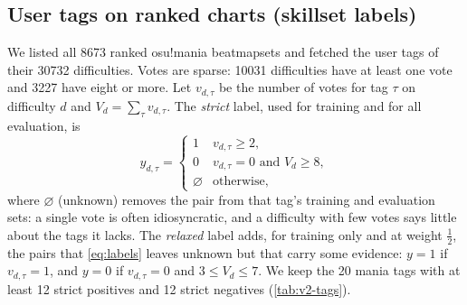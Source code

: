 \documentclass[10pt,twocolumn]{article}
\begin{document}
\subsection{User tags on ranked charts (skillset labels)}\label{sec:tags-data}
We listed all \num{8673} ranked osu!mania beatmapsets and fetched the user tags of their \num{30732} difficulties. Votes are sparse: \num{10031} difficulties have at least one vote and \num{3227} have eight or more. Let $v_{d,\tau}$ be the number of votes for tag $\tau$ on difficulty $d$ and $V_d=\sum_\tau v_{d,\tau}$. The \emph{strict} label, used for training and for all evaluation, is
\begin{equation}
y_{d,\tau}=\begin{cases}1 & v_{d,\tau}\ge 2,\\ 0 & v_{d,\tau}=0\text{ and }V_d\ge 8,\\ \varnothing & \text{otherwise,}\end{cases}
\label{eq:labels}
\end{equation}
where $\varnothing$ (unknown) removes the pair from that tag's training and evaluation sets: a single vote is often idiosyncratic, and a difficulty with few votes says little about the tags it lacks. The \emph{relaxed} label adds, for training only and at weight $\tfrac12$, the pairs that \cref{eq:labels} leaves unknown but that carry some evidence: $y=1$ if $v_{d,\tau}=1$, and $y=0$ if $v_{d,\tau}=0$ and $3\le V_d\le7$. We keep the 20 mania tags with at least 12 strict positives and 12 strict negatives (\cref{tab:v2-tags}).
\end{document}
